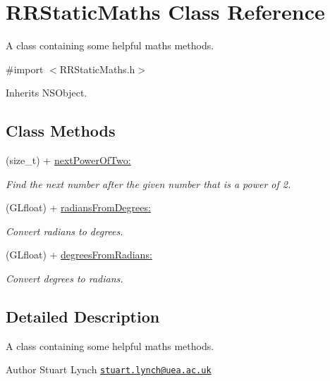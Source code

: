\hypertarget{interface_r_r_static_maths}{\section{R\-R\-Static\-Maths Class Reference}
\label{interface_r_r_static_maths}
}


A class containing some helpful maths methods.  




{\ttfamily \#import $<$R\-R\-Static\-Maths.\-h$>$}



Inherits N\-S\-Object.

\subsection*{Class Methods}
\begin{DoxyCompactItemize}
\item 
(size\-\_\-t) + \hyperlink{interface_r_r_static_maths_a657e5d6cdf9340c2b17944501471bd06}{next\-Power\-Of\-Two\-:}
\begin{DoxyCompactList}\small\item\em Find the next number after the given number that is a power of 2. \end{DoxyCompactList}\item 
(G\-Lfloat) + \hyperlink{interface_r_r_static_maths_a671faa31774a1beff13581de19c30e44}{radians\-From\-Degrees\-:}
\begin{DoxyCompactList}\small\item\em Convert radians to degrees. \end{DoxyCompactList}\item 
(G\-Lfloat) + \hyperlink{interface_r_r_static_maths_a52bfed08f45dfd5365421d538c583c4b}{degrees\-From\-Radians\-:}
\begin{DoxyCompactList}\small\item\em Convert degrees to radians. \end{DoxyCompactList}\end{DoxyCompactItemize}


\subsection{Detailed Description}
A class containing some helpful maths methods. 

\begin{DoxyAuthor}{Author}
Stuart Lynch \href{mailto:stuart.lynch@uea.ac.uk}{\tt stuart.\-lynch@uea.\-ac.\-uk} 
\end{DoxyAuthor}



